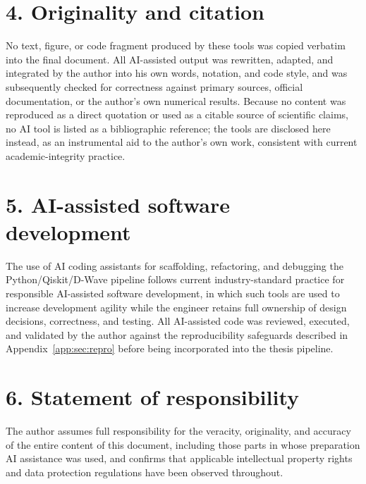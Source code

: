 \documentclass[11pt,a4paper, english]{book}
\theoremstyle{plain}
\theoremstyle{definition}
\numberwithin{equation}{chapter}
\numberwithin{figure}{chapter}
\numberwithin{table}{chapter}
\begin{document}
\section*{4. Originality and citation}
No text, figure, or code fragment produced by these tools was copied
verbatim into the final document. All AI-assisted output was rewritten,
adapted, and integrated by the author into his own words, notation, and
code style, and was subsequently checked for correctness against
primary sources, official documentation, or the author's own numerical
results. Because no content was reproduced as a direct quotation or
used as a citable source of scientific claims, no AI tool is listed as
a bibliographic reference; the tools are disclosed here instead, as an
instrumental aid to the author's own work, consistent with current
academic-integrity practice.

\section*{5. AI-assisted software development}
The use of AI coding assistants for scaffolding, refactoring, and
debugging the Python/Qiskit/D-Wave pipeline follows current
industry-standard practice for responsible AI-assisted software
development, in which such tools are used to increase development
agility while the engineer retains full ownership of design decisions,
correctness, and testing. All AI-assisted code was reviewed, executed,
and validated by the author against the reproducibility safeguards
described in Appendix~\ref{app:sec:repro} before being incorporated
into the thesis pipeline.

\section*{6. Statement of responsibility}
The author assumes full responsibility for the veracity, originality,
and accuracy of the entire content of this document, including those
parts in whose preparation AI assistance was used, and confirms that
applicable intellectual property rights and data protection
regulations have been observed throughout.
\backmatter




\end{document}
